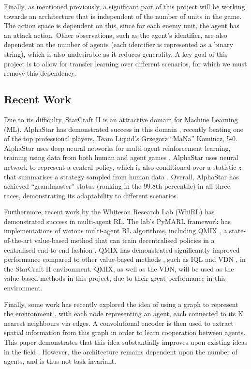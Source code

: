 Finally, as mentioned previously, a significant part of this project will be working towards an architecture that is independent of the number of units in the game. The action space is dependent on this, since for each enemy unit, the agent has an attack action. Other observations, such as the agent's identifier, are also dependent on the number of agents (each identifier is represented as a binary string), which is also undesirable as it reduces generality. A key goal of this project is to allow for transfer learning over different scenarios, for which we must remove this dependency.

\subsection{Recent Work}

Due to its difficulty, StarCraft II is an attractive domain for Machine Learning (ML). AlphaStar has demonstrated success in this domain \cite{alphastar}, recently beating one of the top professional players, Team Liquid’s Grzegorz ``MaNa'' Komincz, 5-0. AlphaStar uses deep neural networks for multi-agent reinforcement learning, training using data from both human and agent games \cite{alphastar}. AlphaStar uses neural network to represent a central policy, which is also conditioned over a statistic $z$ that summarises a strategy sampled from human data \cite{alphastar}. Overall, AlphaStar has achieved ``grandmaster'' status (ranking in the 99.8th percentile) in all three races, demonstrating its adaptability to different scenarios.


Furthermore, recent work by the Whiteson Research Lab (WhiRL) has demonstrated success in multi-agent RL. The lab's PyMARL framework has implementations of various multi-agent RL algorithms, including QMIX \cite{qmixcite}, a state-of-the-art value-based method that can train decentralised policies in a centralised end-to-end fashion \cite{qmixcite}. QMIX has demonstrated significantly improved performance compared to other value-based methods \cite{qmixcite}, such as IQL \cite{IQL} and VDN \cite{vdn}, in the StarCraft II environment. QMIX, as well as the VDN, will be used as the value-based methods in this project, due to their great performance in this environment.

Finally, some work has recently explored the idea of using a graph to represent the environment \cite{graph}, with each node representing an agent, each connected to its K nearest neighbours via edges. A convolutional encoder is then used to extract spatial information from this graph in order to learn cooperation between agents. This paper demonstrates that this idea substantially improves upon existing ideas in the field \cite{graph}. However, the architecture remains dependent upon the number of agents, and is thus not task invariant.



